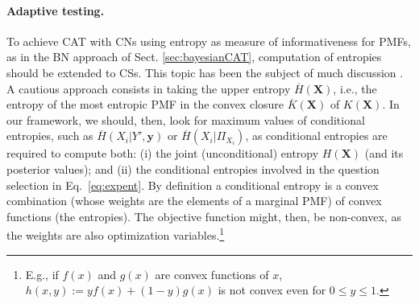 \documentclass[runningheads]{llncs}
\begin{document}
	\paragraph{Adaptive testing.}
	To achieve CAT with CNs using entropy as measure of informativeness for PMFs, as in 
	the BN approach of Sect. \ref{sec:bayesianCAT}, computation of entropies should be 
	extended to CSs. This topic has been the subject of much discussion 
	\cite{klir1999uncertainty}. A cautious approach \cite{abellan2003maximum} consists in 
	taking the upper entropy $\overline{H}(\bm{X})$, i.e., the entropy of the most entropic 
	PMF in the convex closure $\overline{K}(\bm{X})$ of  $K(\bm{X})$. 
	In our framework, we should, then, look for maximum values of conditional entropies, 
	such as $\overline{H}(X_i|Y',\bm{y})$ or $\overline{H}(X_i|\Pi_{X_i})$, as conditional 
	entropies are required to compute both: (i) the joint (unconditional) entropy 
	$H(\bm{X})$ (and its posterior values); and (ii) the conditional entropies  involved in 
	the  question selection in Eq.~\eqref{eq:expent}.
	By definition a conditional entropy is a convex combination (whose weights are the 
	elements of a marginal PMF) of convex functions (the entropies). The objective 
	function might, then, be non-convex, as the weights are also optimization 
	variables.\footnote{E.g., if $f(x)$ and $g(x)$ are convex functions of $x$, $h(x,y):= y 
	f(x) + (1-y) g(x)$ is not convex even for $0 \leq y \leq 1$.} 
	
\end{document}
